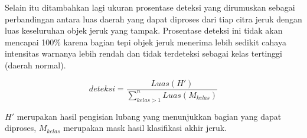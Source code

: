 \documentclass[laporan.tex]{subfiles}
\begin{document}
Selain itu ditambahkan lagi ukuran prosentase deteksi yang dirumuskan sebagai perbandingan antara luas daerah yang dapat diproses dari tiap citra jeruk dengan luas keseluruhan objek jeruk yang tampak. Prosentase deteksi ini tidak akan mencapai 100\% karena bagian tepi objek jeruk menerima lebih sedikit cahaya intensitas warnanya lebih rendah dan tidak terdeteksi sebagai kelas tertinggi (daerah normal).

\begin{equation}
	deteksi = \frac{Luas(H')}{\sum_{kelas>1}^n Luas(M_{kelas})}
\end{equation}

$H'$ merupakan hasil pengisian lubang yang menunjukkan bagian yang dapat diproses, $M_{kelas}$ merupakan mask hasil klasifikasi akhir jeruk.
\end{document}
